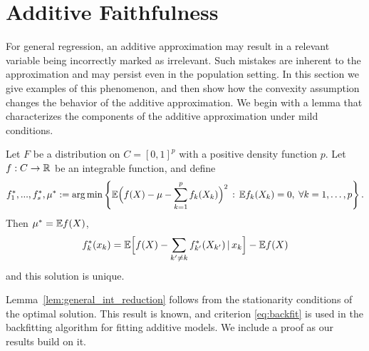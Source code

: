 
\section{Additive Faithfulness}
\label{sec:additivefaithful}

For general regression, an additive approximation may result in a
relevant variable being incorrectly marked as irrelevant. Such
mistakes are inherent to the approximation and may persist even in
the population setting.  In this section we give
examples of this phenomenon, and then show how the convexity
assumption
changes the behavior of the additive approximation. We begin
with a lemma that characterizes the components of the additive approximation under mild conditions.



\begin{lemma}
\label{lem:general_int_reduction}
Let $F$ be a distribution on $C=[0,1]^p$ with a positive density
function $p$. Let $f: C \rightarrow {\mathbb R}$ be an integrable function,
and define 
\begin{equation}
f^*_1,...,f^*_s, \mu^* := 
\arg\min \left\{ {\mathbb E} \Bigl( f(X) - \mu - \sum_{k=1}^p f_k(X_k)\Bigr)^2 \,:\,
{\mathbb E} f_k(X_k) = 0,\; \forall k=1,\ldots, p \right\}.
\end{equation}
Then $\mu^* = {\mathbb E} f(X)$,
\begin{equation}
\label{eq:backfit}
f^*_k(x_k) = {\mathbb E}\Bigl[ f(X) - \sum_{k' \neq k} f^*_{k'}(X_{k'}) {\,|\,}
x_k\Bigr] - {\mathbb E} f(X) 
\end{equation}
and this solution is unique.
\end{lemma}


Lemma~\ref{lem:general_int_reduction} follows from the stationarity
conditions of the optimal solution.   This result is known, and
criterion \eqref{eq:backfit} is used in the backfitting
algorithm for fitting additive models.   We include 
a proof as our results build on it.

